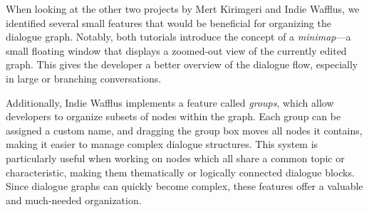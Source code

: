When looking at the other two projects by Mert Kirimgeri and Indie Wafflus, we identified several small features that would be beneficial for organizing the dialogue graph. Notably, both tutorials introduce the concept of a \textit{minimap}—a small floating window that displays a zoomed-out view of the currently edited graph. This gives the developer a better overview of the dialogue flow, especially in large or branching conversations. 

Additionally, Indie Wafflus implements a feature called \textit{groups}, which allow developers to organize subsets of nodes within the graph. Each group can be assigned a custom name, and dragging the group box moves all nodes it contains, making it easier to manage complex dialogue structures. This system is particularly useful when working on nodes which all share a common topic or characteristic, making them thematically or logically connected dialogue blocks. Since dialogue graphs can quickly become complex, these features offer a valuable and much-needed organization. 